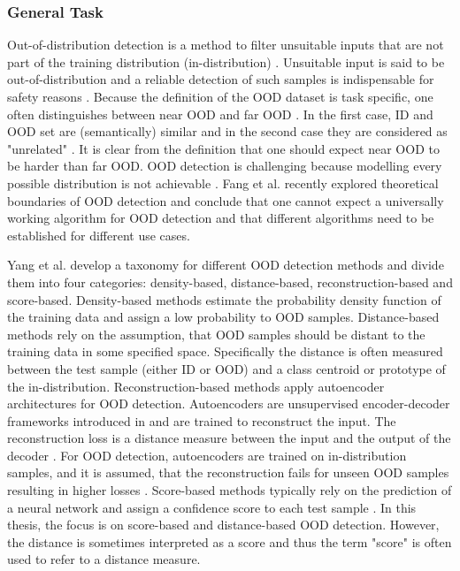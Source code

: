 \subsubsection{General Task}
Out-of-distribution detection is a method to filter unsuitable inputs that are not part of the training distribution (in-distribution) \citep{Yang2021}.
Unsuitable input is said to be out-of-distribution and a reliable detection of such samples is indispensable for safety reasons \citep{Yang2021}.
Because the definition of the OOD dataset is task specific, one often distinguishes between near OOD and far OOD \citep{Winkens2020}.
In the first case, ID and OOD set are (semantically) similar and in the second case they are considered as "unrelated" \citep{Winkens2020}.
It is clear from the definition that one should expect near OOD to be harder than far OOD.
OOD detection is challenging because modelling every possible distribution is not achievable \citep{Salehi2022}.
Fang et al. \citep{Fang2023} recently explored theoretical boundaries of OOD detection and conclude that one cannot expect a universally working algorithm for OOD detection and that different algorithms need to be established for different use cases.
\par
Yang et al. \citep{Yang2021} develop a taxonomy for different OOD detection methods and divide them into four categories: density-based, distance-based, reconstruction-based and score-based.
Density-based methods estimate the probability density function of the training data and assign a low probability to OOD samples.
Distance-based methods rely on the assumption, that OOD samples should be distant to the training data in some specified space.
Specifically the distance is often measured between the test sample (either ID or OOD) and a class centroid or prototype of the in-distribution.
Reconstruction-based methods apply autoencoder architectures for OOD detection.
Autoencoders are unsupervised encoder-decoder frameworks introduced in \citep{Rumelhart1986} and are trained to reconstruct the input.
The reconstruction loss is a distance measure between the input and the output of the decoder \citep{Baldi2012, Bank2020}.
For OOD detection, autoencoders are trained on in-distribution samples, and it is assumed, that the reconstruction fails for unseen OOD samples resulting in higher losses \citep{Denouden2018}.
Score-based methods typically rely on the prediction of a neural network and assign a confidence score to each test sample \citep{Yang2021}.
In this thesis, the focus is on score-based and distance-based OOD detection.
However, the distance is sometimes interpreted as a score and thus the term "score" is often used to refer to a distance measure.
